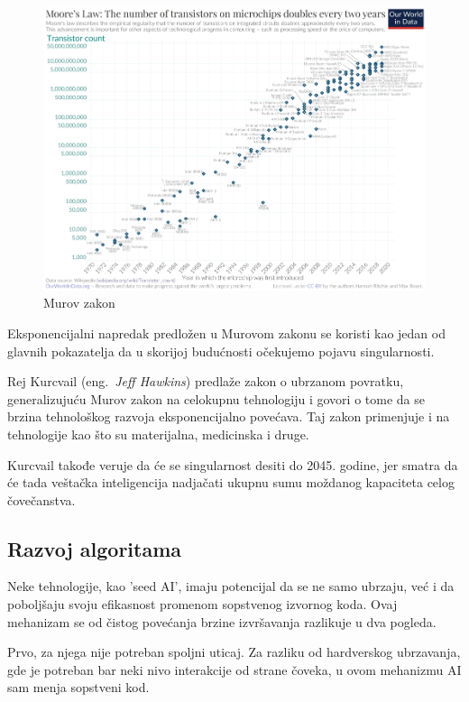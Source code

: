 \documentclass[a4paper]{article}
\begin{document}
\begin{figure}[h!]
\begin{center}
\includegraphics[scale=0.35]{moore.png}
\end{center}
\caption{Murov zakon}
\label{fig:grafik}
\end{figure}

Eksponencijalni napredak predložen u Murovom zakonu se koristi kao jedan od glavnih pokazatelja da u skorijoj budućnosti očekujemo pojavu singularnosti.

Rej Kurcvail (eng.~{\em Jeff Hawkins}) predlaže zakon o ubrzanom povratku, generalizujuću Murov zakon na celokupnu tehnologiju i govori o tome da se brzina tehnološkog razvoja eksponencijalno povećava. Taj zakon primenjuje i na tehnologije kao što su materijalna, medicinska i druge.

Kurcvail takođe veruje da će se singularnost desiti do 2045. godine, jer smatra da će tada veštačka inteligencija nadjačati ukupnu sumu moždanog kapaciteta celog čovečanstva.


\subsection{Razvoj algoritama}

Neke tehnologije, kao 'seed AI', imaju potencijal da se ne samo ubrzaju, već i da poboljšaju svoju efikasnost promenom sopstvenog izvornog koda. 
Ovaj mehanizam se od čistog povećanja brzine izvršavanja razlikuje u dva pogleda.

Prvo, za njega nije potreban spoljni uticaj. Za razliku od hardverskog ubrzavanja, gde je potreban bar neki nivo interakcije od strane čoveka, u ovom mehanizmu AI sam menja sopstveni kod.
\end{document}
